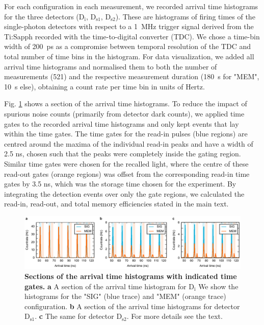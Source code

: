 For each configuration in each measurement, we recorded arrival time histograms for the three detectors ($\mathrm{D_{i}}$, $\mathrm{D_{s1}}$, $\mathrm{D_{s2}}$). These are histograms of firing times of the single-photon detectors with respect to a 1~MHz trigger signal derived from the Ti:Sapph recorded with the time-to-digital converter (TDC). We chose a time-bin width of 200~ps as a compromise between temporal resolution of the TDC and total number of time bins in the histogram. For data visualization, we added all arrival time histograms and normalised them to both the number of measurements (521) and the respective measurement duration (180~s for "MEM", 10~s else), obtaining a count rate per time bin in units of Hertz. 

Fig. \ref{fig:arrival_time_02} shows a section of the arrival time histograms. To reduce the impact of spurious noise counts (primarily from detector dark counts), we applied time gates to the recorded arrival time histograms and only kept events that lay within the time gates. The time gates for the read-in pulses (blue regions) are centred around the maxima of the individual read-in peaks and have a width of 2.5 ns, chosen such that the peaks were completely inside the gating region. Similar time gates were chosen for the recalled light, where the centre of these read-out gates (orange regions) was offset from the corresponding read-in time gates by 3.5 ns, which was the storage time chosen for the experiment. By integrating the detection events over only the gate regions, we calculated the read-in, read-out, and total memory efficiencies stated in the main text.  

\begin{figure}
\centering
\includegraphics[width=\linewidth]{supplements_arrival_time_02.pdf}
\caption{\textbf{Sections of the arrival time histograms with indicated time gates.} \textbf{a} A section of the arrival time histogram for $\mathrm{D_{i}}$ We show the histograms for the "SIG" (blue trace) and "MEM" (orange trace) configuration. \textbf{b} A section of the arrival time histograms for detector $\mathrm{D_{s1}}$. \textbf{c} The same for detector $\mathrm{D_{s2}}$. For more details see the text.}
\label{fig:arrival_time_02}
\end{figure}

